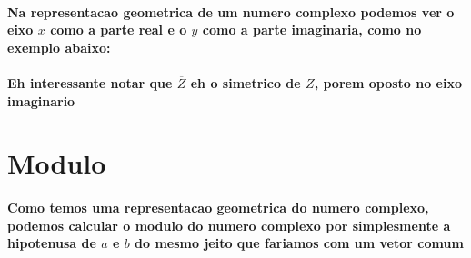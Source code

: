 \documentclass[12pt,twoside, a4paper, twocolumn]{article}
\newcommand{\drawvector} [9] [color=cyan] {
    \draw[line width=1.5pt,#1,-stealth](axis cs: #2, #3)--(axis cs: #4, #5) node[anchor=south west]{$#6$};

    

\ifthenelse{\equal{#7}{true}}{
    \draw[line width=1pt,#1, dashed](axis cs: #4, #5)--(axis cs: #4, 0) node[anchor= north west]{$#8$};
    \draw[line width=1pt,#1, dashed](axis cs: #4, #5)--(axis cs: 0, #5) node[anchor=south east]{$#9$};
    }
    {}
}
\begin{document}
\paragraph{Na representacao geometrica de um numero complexo podemos ver o eixo $x$ como a parte real e o $y$ como a parte imaginaria, como no exemplo abaixo:}
\paragraph*{}


\begin{adjustbox}{scale=0.9}
\end{adjustbox}

\paragraph*{Eh interessante notar que $\overline{Z}$ eh o simetrico de $Z$, porem oposto no eixo imaginario}

\section{Modulo}

\paragraph*{Como temos uma representacao geometrica do numero complexo, podemos calcular o modulo do numero complexo por simplesmente a hipotenusa de $a$ e $b$ do mesmo jeito que fariamos com um vetor comum}
\end{document}
